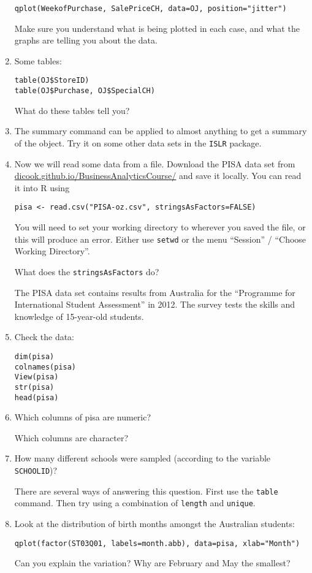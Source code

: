 \documentclass[11pt]{article}
\begin{document}
\begin{enumerate}
\begin{verbatim}
qplot(WeekofPurchase, SalePriceCH, data=OJ, position="jitter")
\end{verbatim}
Make sure you understand what is being plotted in each case, and what the graphs are telling you about the data.

\item Some tables:
\begin{verbatim}
table(OJ$StoreID)
table(OJ$Purchase, OJ$SpecialCH)
\end{verbatim}
What do these tables tell you?


\item The summary command can be applied to almost anything to get a summary of the object. Try it on some other data sets in the \verb|ISLR| package.

\item Now we will read some data from a file. Download the PISA data set from \url{dicook.github.io/BusinessAnalyticsCourse/} and save it locally. You can read it into R using
\begin{verbatim}
pisa <- read.csv("PISA-oz.csv", stringsAsFactors=FALSE)
\end{verbatim}
You will need to set your working directory to wherever you saved the file, or this will produce an error.  Either use \verb|setwd| or the menu ``Session'' / ``Choose Working Directory''.

What does the \verb|stringsAsFactors| do?

The PISA data set contains results from Australia for the ``Programme for International Student Assessment'' in 2012. The survey tests the skills and knowledge of 15-year-old students.

\item Check the data:
\begin{verbatim}
dim(pisa)
colnames(pisa)
View(pisa)
str(pisa)
head(pisa)
\end{verbatim}

\item Which columns of pisa are numeric?

Which columns are character?

\item How many different schools were sampled (according to the variable \verb|SCHOOLID|)?

There are several ways of answering this question. First use the \verb|table| command. Then try using a combination of \verb|length| and \verb|unique|.


\item Look at the distribution of birth months amongst the Australian students:
\begin{verbatim}
qplot(factor(ST03Q01, labels=month.abb), data=pisa, xlab="Month")
\end{verbatim}
Can you explain the variation? Why are February and May the smallest?


\end{enumerate}
\end{document}
